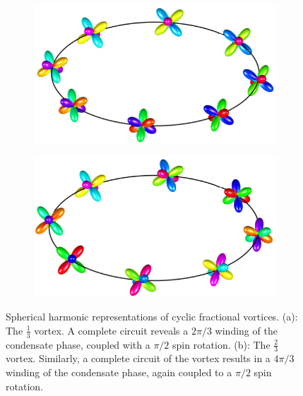 \begin{figure}
    \centering
    \begin{subfigure}{0.49\textwidth}
        \includegraphics[width=\textwidth]
        {gfx/ch-groundStateSymmetries/one-third-vortex.pdf}
        \caption{}
    \end{subfigure}
    \begin{subfigure}{0.49\textwidth}
        \includegraphics[width=\textwidth]
        {gfx/ch-groundStateSymmetries/two-third-vortex.pdf}
        \caption{}
    \end{subfigure}
    \caption{\label{fig: cyclic-fractional-spherical}Spherical harmonic
        representations of cyclic fractional vortices.
        (a): The \(\frac{1}{3}\) vortex. A complete circuit reveals a \(2\pi/3\)
        winding of the condensate phase, coupled with a \(\pi/2\) spin rotation.
        (b): The \(\frac{2}{3}\) vortex. Similarly, a complete circuit of the vortex
        results in a \(4\pi/3\) winding of the condensate phase, again coupled to
        a \(\pi/2\) spin rotation.}
\end{figure}
